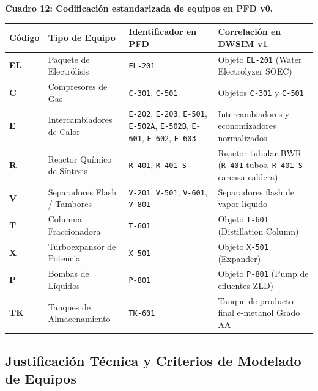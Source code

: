 \documentclass[11pt,letterpaper]{article}
\begin{document}
\vspace{0.4cm}
\begin{center}
\small
\textbf{Cuadro 12: Codificación estandarizada de equipos en PFD v0.}\\[3pt]
\begin{tabularx}{\textwidth}{>{\centering\arraybackslash}p{1.4cm} >{\raggedright\arraybackslash}p{4.0cm} >{\raggedright\arraybackslash}p{3.7cm} >{\raggedright\arraybackslash}X}
\toprule
\textbf{Código} & \textbf{Tipo de Equipo} & \textbf{Identificador en PFD} & \textbf{Correlación en DWSIM v1} \\
\midrule
\textbf{EL} & Paquete de Electrólisis & \texttt{EL-201} & Objeto \texttt{EL-201} (Water Electrolyzer SOEC) \\
\textbf{C} & Compresores de Gas & \texttt{C-301}, \texttt{C-501} & Objetos \texttt{C-301} y \texttt{C-501} \\
\textbf{E} & Intercambiadores de Calor & \texttt{E-202}, \texttt{E-203}, \texttt{E-501}, \texttt{E-502A}, \texttt{E-502B}, \texttt{E-601}, \texttt{E-602}, \texttt{E-603} & Intercambiadores y economizadores normalizados \\
\textbf{R} & Reactor Químico de Síntesis & \texttt{R-401}, \texttt{R-401-S} & Reactor tubular BWR (\texttt{R-401} tubos, \texttt{R-401-S} carcasa caldera) \\
\textbf{V} & Separadores Flash / Tambores & \texttt{V-201}, \texttt{V-501}, \texttt{V-601}, \texttt{V-801} & Separadores flash de vapor-líquido \\
\textbf{T} & Columna Fraccionadora & \texttt{T-601} & Objeto \texttt{T-601} (Distillation Column) \\
\textbf{X} & Turboexpansor de Potencia & \texttt{X-501} & Objeto \texttt{X-501} (Expander) \\
\textbf{P} & Bombas de Líquidos & \texttt{P-801} & Objeto \texttt{P-801} (Pump de efluentes ZLD) \\
\textbf{TK} & Tanques de Almacenamiento & \texttt{TK-601} & Tanque de producto final e-metanol Grado AA \\
\bottomrule
\end{tabularx}
\end{center}


\clearpage

\subsection{Justificación Técnica y Criterios de Modelado de Equipos}
\end{document}
